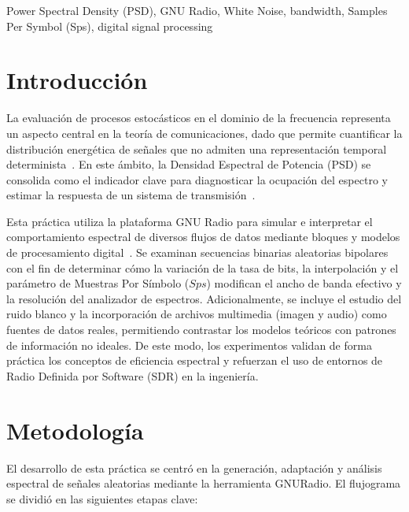 \documentclass[twocolumn]{IEEEtran}
\begin{document}
\begin{IEEEkeywords}
Power Spectral Density (PSD), GNU Radio, White Noise, bandwidth, Samples Per Symbol (Sps), digital signal processing
\end{IEEEkeywords}

\section{Introducción}

 La evaluación de procesos estocásticos en el dominio de la frecuencia representa un aspecto central en la teoría de comunicaciones, dado que permite cuantificar la distribución energética de señales que no admiten una representación temporal determinista~\cite{libro_comunicaciones}. En este ámbito, la Densidad Espectral de Potencia (PSD) se consolida como el indicador clave para diagnosticar la ocupación del espectro y estimar la respuesta de un sistema de transmisión~\cite{libro_comunicaciones}.

Esta práctica utiliza la plataforma GNU Radio para simular e interpretar el comportamiento espectral de diversos flujos de datos mediante bloques y modelos de procesamiento digital~\cite{gnuradio_python}. Se examinan secuencias binarias aleatorias bipolares con el fin de determinar cómo la variación de la tasa de bits, la interpolación y el parámetro de Muestras Por Símbolo ($Sps$) modifican el ancho de banda efectivo y la resolución del analizador de espectros. Adicionalmente, se incluye el estudio del ruido blanco y la incorporación de archivos multimedia (imagen y audio) como fuentes de datos reales, permitiendo contrastar los modelos teóricos con patrones de información no ideales. De este modo, los experimentos validan de forma práctica los conceptos de eficiencia espectral y refuerzan el uso de entornos de Radio Definida por Software (SDR) en la ingeniería.

\section{Metodología}

El desarrollo de esta práctica se centró en la generación, adaptación y análisis espectral de señales aleatorias mediante la herramienta GNURadio. El flujograma se dividió en las siguientes etapas clave:
\end{document}
